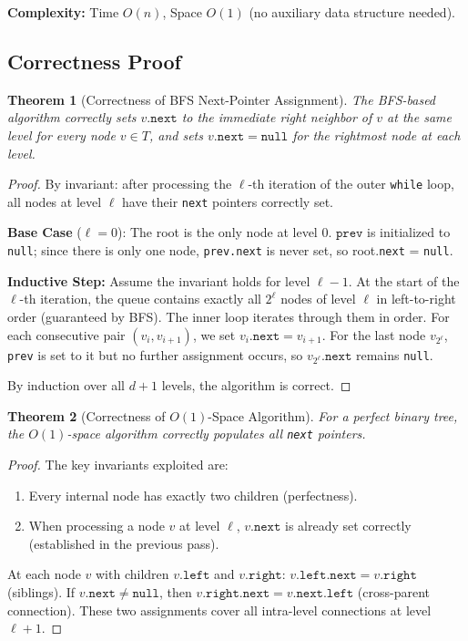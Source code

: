 \documentclass[10pt,journal,compsoc,onecolumn]{IEEEtran}
\newtheorem{theorem}{Theorem}
\begin{document}
\textbf{Complexity:} Time $O(n)$, Space $O(1)$ (no auxiliary data structure needed).

\subsection{Correctness Proof}

\begin{theorem}[Correctness of BFS Next-Pointer Assignment]
The BFS-based algorithm correctly sets $v.\texttt{next}$ to the immediate right neighbor of $v$ at the same level for every node $v \in T$, and sets $v.\texttt{next} = \texttt{null}$ for the rightmost node at each level.
\end{theorem}

\begin{proof}
By invariant: after processing the $\ell$-th iteration of the outer \texttt{while} loop, all nodes at level $\ell$ have their \texttt{next} pointers correctly set.

\textbf{Base Case} ($\ell = 0$): The root is the only node at level 0. $\texttt{prev}$ is initialized to \texttt{null}; since there is only one node, \texttt{prev.next} is never set, so root.\texttt{next} = \texttt{null}. \checkmark

\textbf{Inductive Step:} Assume the invariant holds for level $\ell - 1$. At the start of the $\ell$-th iteration, the queue contains exactly all $2^\ell$ nodes of level $\ell$ in left-to-right order (guaranteed by BFS). The inner loop iterates through them in order. For each consecutive pair $(v_i, v_{i+1})$, we set $v_i.\texttt{next} = v_{i+1}$. For the last node $v_{2^\ell}$, \texttt{prev} is set to it but no further assignment occurs, so $v_{2^\ell}.\texttt{next}$ remains \texttt{null}. \checkmark

By induction over all $d+1$ levels, the algorithm is correct.
\end{proof}

\begin{theorem}[Correctness of $O(1)$-Space Algorithm]
For a perfect binary tree, the $O(1)$-space algorithm correctly populates all \texttt{next} pointers.
\end{theorem}

\begin{proof}
The key invariants exploited are:
\begin{enumerate}
    \item Every internal node has exactly two children (perfectness).
    \item When processing a node $v$ at level $\ell$, $v.\texttt{next}$ is already set correctly (established in the previous pass).
\end{enumerate}
At each node $v$ with children $v.\texttt{left}$ and $v.\texttt{right}$: $v.\texttt{left}.\texttt{next} = v.\texttt{right}$ (siblings). If $v.\texttt{next} \neq \texttt{null}$, then $v.\texttt{right}.\texttt{next} = v.\texttt{next}.\texttt{left}$ (cross-parent connection). These two assignments cover all intra-level connections at level $\ell + 1$.
\end{proof}
\end{document}
